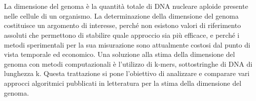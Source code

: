 \documentclass[crop=false]{standalone}
\begin{document}
	
	\chapter*{\abstractname}
		La dimensione del genoma è la quantità totale di DNA nucleare aploide presente nelle cellule di un organismo. La determinazione della dimensione del genoma costituisce un argomento di interesse, perché non esistono valori di riferimento assoluti che permettono di stabilire quale approccio sia più efficace, e perché i metodi sperimentali per la sua misurazione sono attualmente costosi dal punto di vista temporale ed economico. Una soluzione alla stima della dimensione del genoma con metodi computazionali è l'utilizzo di k-mers, sottostringhe di DNA di lunghezza k. Questa trattazione si pone l'obiettivo di analizzare e comparare vari approcci algoritmici pubblicati in letteratura per la stima della dimensione del genoma.
	
	
	\cleardoublepage
\end{document}
